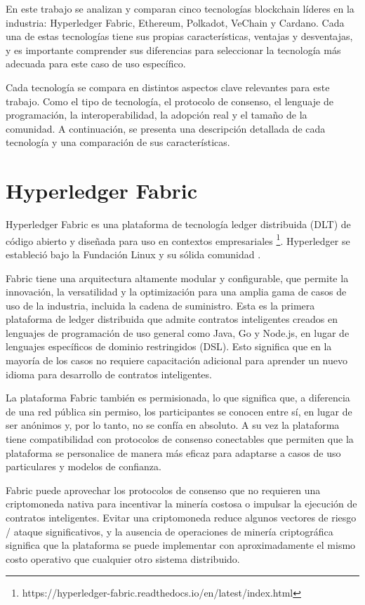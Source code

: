 \documentclass{article}
\begin{document}
En este trabajo se analizan y comparan cinco tecnologías blockchain líderes en la industria: Hyperledger Fabric, Ethereum, Polkadot, VeChain y Cardano. Cada una de estas tecnologías tiene sus propias características, ventajas y desventajas, y es importante comprender sus diferencias para seleccionar la tecnología más adecuada para este caso de uso específico.

Cada tecnología se compara en distintos aspectos clave relevantes para este trabajo. Como el tipo de tecnología, el protocolo de consenso, el lenguaje de programación, la interoperabilidad, la adopción real y el tamaño de la comunidad. A continuación, se presenta una descripción detallada de cada tecnología y una comparación de sus características.

\section{Hyperledger Fabric}

Hyperledger Fabric es una plataforma de tecnología ledger distribuida (DLT) de código abierto y diseñada para uso en contextos empresariales \footnote{https://hyperledger-fabric.readthedocs.io/en/latest/index.html}. Hyperledger se estableció bajo la Fundación Linux y su sólida comunidad \cite{androulaki2018hyperledger}. 

Fabric tiene una arquitectura altamente modular y configurable, que permite la innovación, la versatilidad y la optimización para una amplia gama de casos de uso de la industria, incluida la cadena de suministro. Esta es la primera plataforma de ledger distribuida que admite contratos inteligentes creados en lenguajes de programación de uso general como Java, Go y Node.js, en lugar de lenguajes específicos de dominio restringidos (DSL). Esto significa que en la mayoría de los casos no requiere capacitación adicional para aprender un nuevo idioma para desarrollo de contratos inteligentes.

La plataforma Fabric también es permisionada, lo que significa que, a diferencia de una red pública sin permiso, los participantes se conocen entre sí, en lugar de ser anónimos y, por lo tanto, no se confía en absoluto. A su vez la plataforma tiene compatibilidad con protocolos de consenso conectables que permiten que la plataforma se personalice de manera más eficaz para adaptarse a casos de uso particulares y modelos de confianza. 

Fabric puede aprovechar los protocolos de consenso que no requieren una criptomoneda nativa para incentivar la minería costosa o impulsar la ejecución de contratos inteligentes. Evitar una criptomoneda reduce algunos vectores de riesgo / ataque significativos, y la ausencia de operaciones de minería criptográfica significa que la plataforma se puede implementar con aproximadamente el mismo costo operativo que cualquier otro sistema distribuido.
\end{document}
